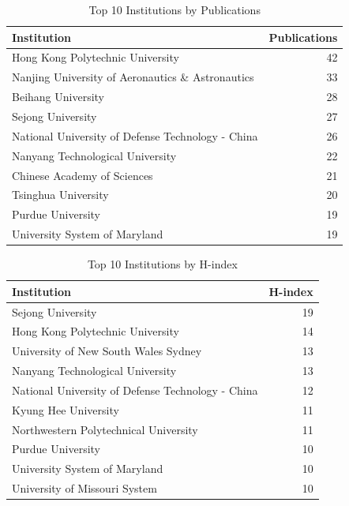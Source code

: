 \documentclass{article}
\begin{document}
\begin{table}[htbp]
  \centering
  \caption{Top 10 Institutions by Publications} 
  \label{tab:publications}
  \begin{tabularx}{0.9\textwidth}{@{} >{\raggedright}X r @{}}
    \toprule
    Institution & Publications \\
    \midrule
    Hong Kong Polytechnic University & 42 \\
    Nanjing University of Aeronautics \& Astronautics & 33 \\
    Beihang University & 28 \\
    Sejong University & 27 \\
    National University of Defense Technology - China & 26 \\
    Nanyang Technological University & 22 \\
    Chinese Academy of Sciences & 21 \\
    Tsinghua University & 20 \\
    Purdue University & 19 \\
    University System of Maryland & 19 \\
    \bottomrule
  \end{tabularx}
\end{table}

\begin{table}[htbp]
  \centering
  \caption{Top 10 Institutions by H-index}
  \label{tab:hindex}
  \begin{tabularx}{0.9\textwidth}{@{} >{\raggedright}X r @{}}
    \toprule
    Institution & H-index \\
    \midrule
    Sejong University & 19 \\
    Hong Kong Polytechnic University & 14 \\
    University of New South Wales Sydney & 13 \\
    Nanyang Technological University & 13 \\
    National University of Defense Technology - China & 12 \\
    Kyung Hee University & 11 \\
    Northwestern Polytechnical University & 11 \\
    Purdue University & 10 \\
    University System of Maryland & 10 \\
    University of Missouri System & 10 \\
    \bottomrule
  \end{tabularx}
\end{table}
\end{document}
